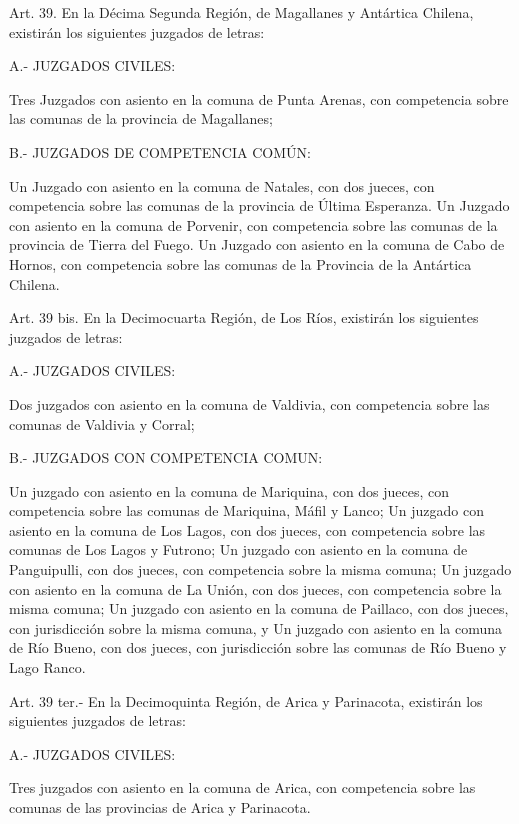    Art. 39. En la Décima Segunda Región, de Magallanes y Antártica Chilena, existirán los siguientes juzgados de letras:

    A.- JUZGADOS CIVILES:

    Tres Juzgados con asiento en la comuna de Punta Arenas, con competencia sobre las comunas de la provincia de Magallanes;

    B.- JUZGADOS DE COMPETENCIA COMÚN:

    Un Juzgado con asiento en la comuna de Natales, con dos jueces, con competencia sobre las comunas de la provincia de Última Esperanza.
    Un Juzgado con asiento en la comuna de Porvenir, con competencia sobre las comunas de la provincia de Tierra del Fuego.
    Un Juzgado con asiento en la comuna de Cabo de Hornos, con competencia sobre las comunas de la Provincia de la Antártica Chilena.


    Art. 39 bis. En la Decimocuarta Región, de Los Ríos, existirán los siguientes juzgados de letras:

    A.- JUZGADOS CIVILES:

    Dos juzgados con asiento en la comuna de Valdivia, con competencia sobre las comunas de Valdivia y Corral;

    B.- JUZGADOS CON COMPETENCIA COMUN:

    Un juzgado con asiento en la comuna de Mariquina, con dos jueces, con competencia sobre las comunas de Mariquina, Máfil y Lanco;
    Un juzgado con asiento en la comuna de Los Lagos, con dos jueces, con competencia sobre las comunas de Los Lagos y Futrono;
    Un juzgado con asiento en la comuna de Panguipulli, con dos jueces, con competencia sobre la misma comuna;
    Un juzgado con asiento en la comuna de La Unión, con dos jueces, con competencia sobre la misma comuna;
    Un juzgado con asiento en la comuna de Paillaco, con dos jueces, con jurisdicción sobre la misma comuna, y
    Un juzgado con asiento en la comuna de Río Bueno, con dos jueces, con jurisdicción sobre las comunas de Río Bueno y Lago Ranco.




    Art. 39 ter.- En la Decimoquinta Región, de Arica y Parinacota, existirán los siguientes juzgados de letras:

    A.- JUZGADOS CIVILES:

    Tres juzgados con asiento en la comuna de Arica, con competencia sobre las comunas de las provincias de Arica y Parinacota.

